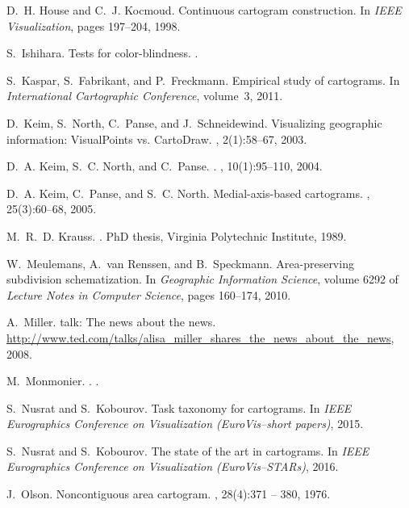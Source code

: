 \documentclass[10pt,journal,compsoc]{IEEEtran}
\begin{document}
\begin{thebibliography}{10}
D.~H. House and C.~J. Kocmoud.
\newblock Continuous cartogram construction.
\newblock In {\em IEEE Visualization}, pages 197--204, 1998.

S.~Ishihara.
\newblock Tests for color-blindness.
.

S.~Kaspar, S.~Fabrikant, and P.~Freckmann.
\newblock Empirical study of cartograms.
\newblock In {\em International Cartographic Conference}, volume~3, 2011.

D.~Keim, S.~North, C.~Panse, and J.~Schneidewind.
\newblock Visualizing geographic information: {VisualPoints vs. CartoDraw}.
, 2(1):58--67, 2003.

D.~A. Keim, S.~C. North, and C.~Panse.
.
,
  10(1):95--110, 2004.

D.~A. Keim, C.~Panse, and S.~C. North.
\newblock Medial-axis-based cartograms.
, 25(3):60--68, 2005.

M.~R.~D. Krauss.
.
\newblock PhD thesis, Virginia Polytechnic Institute, 1989.

W.~Meulemans, A.~van Renssen, and B.~Speckmann.
\newblock Area-preserving subdivision schematization.
\newblock In {\em Geographic Information Science}, volume 6292 of {\em Lecture
  Notes in Computer Science}, pages 160--174, 2010.

A.~Miller.
 talk: The news about the news.
\newblock
  \url{http://www.ted.com/talks/alisa_miller_shares_the_news_about_the_news},
  2008.

M.~Monmonier.
.
.

S.~Nusrat and S.~Kobourov.
\newblock Task taxonomy for cartograms.
\newblock In {\em IEEE Eurographics Conference on Visualization (EuroVis--short
  papers)}, 2015.

S.~Nusrat and S.~Kobourov.
\newblock The state of the art in cartograms.
\newblock In {\em IEEE Eurographics Conference on Visualization
  (EuroVis--STARs)}, 2016.

J.~Olson.
\newblock Noncontiguous area cartogram.
, 28(4):371 -- 380, 1976.


\end{thebibliography}
\end{document}
